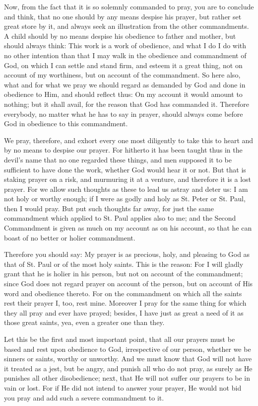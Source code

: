 Now, from the fact that it is so solemnly commanded to pray, you are to
conclude and think, that no one should by any means despise his prayer,
but rather set great store by it, and always seek an illustration from
the other commandments. A child should by no means despise his
obedience to father and mother, but should always think: This work is a
work of obedience, and what I do I do with no other intention than that
I may walk in the obedience and commandment of God, on which I can
settle and stand firm, and esteem it a great thing, not on account of
my worthiness, but on account of the commandment. So here also, what
and for what we pray we should regard as demanded by God and done in
obedience to Him, and should reflect thus: On my account it would
amount to nothing; but it shall avail, for the reason that God has
commanded it. Therefore everybody, no matter what he has to say in
prayer, should always come before God in obedience to this commandment.


We pray, therefore, and exhort every one most diligently to take this
to heart and by no means to despise our prayer. For hitherto it has
been taught thus in the devil's name that no one regarded these things,
and men supposed it to be sufficient to have done the work, whether God
would hear it or not. But that is staking prayer on a risk, and
murmuring it at a venture, and therefore it is a lost prayer. For we
allow such thoughts as these to lead us astray and deter us: I am not
holy or worthy enough; if I were as godly and holy as St. Peter or St.
Paul, then I would pray. But put such thoughts far away, for just the
same commandment which applied to St. Paul applies also to me; and the
Second Commandment is given as much on my account as on his account, so
that he can boast of no better or holier commandment.

Therefore you should say: My prayer is as precious, holy, and pleasing
to God as that of St. Paul or of the most holy saints. This is the
reason: For I will gladly grant that he is holier in his person, but
not on account of the commandment; since God does not regard prayer on
account of the person, but on account of His word and obedience
thereto. For on the commandment on which all the saints rest their
prayer I, too, rest mine. Moreover I pray for the same thing for which
they all pray and ever have prayed; besides, I have just as great a
need of it as those great saints, yea, even a greater one than they.

Let this be the first and most important point, that all our prayers
must be based and rest upon obedience to God, irrespective of our
person, whether we be sinners or saints, worthy or unworthy. And we
must know that God will not have it treated as a jest, but be angry,
and punish all who do not pray, as surely as He punishes all other
disobedience; next, that He will not suffer our prayers to be in vain
or lost. For if He did not intend to answer your prayer, He would not
bid you pray and add such a severe commandment to it.

